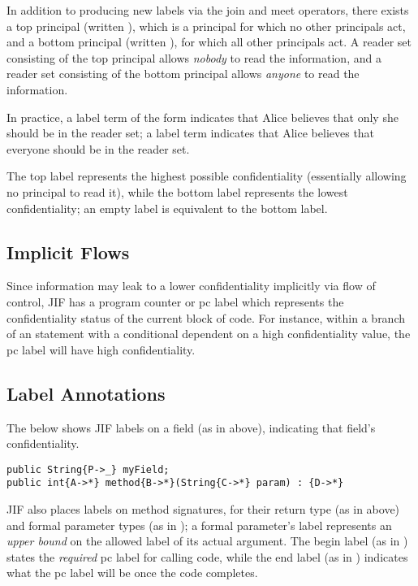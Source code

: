 In addition to producing new labels via the join and meet operators, there exists a top principal (written \code{*}), which is a principal for which no other principals act, and a bottom principal (written \code{_}), for which all other principals act. A reader set consisting of the top principal allows \textit{nobody} to read the information, and a reader set consisting of the bottom principal allows \textit{anyone} to read the information.

In practice, a label term of the form  indicates that Alice believes that only she should be in the reader set; a label term  indicates that Alice believes that everyone should be in the reader set.

The top label \jiflabel{*->*} represents the highest possible confidentiality (essentially allowing no principal to read it), while the bottom label \jiflabel{_->_} represents the lowest confidentiality; an empty label \jiflabel{} is equivalent to the bottom label.

\subsection{Implicit Flows}

Since information may leak to a lower confidentiality implicitly via flow of control, JIF has a program counter or pc label which represents the confidentiality status of the current block of code. For instance, within a branch of an  statement with a conditional dependent on a high confidentiality value, the pc label will have high confidentiality.

\subsection{Label Annotations}

The below shows JIF labels on a field (as in  above), indicating that field's confidentiality.

\begin{verbatim}
public String{P->_} myField;
public int{A->*} method{B->*}(String{C->*} param) : {D->*}
\end{verbatim}

JIF also places labels on method signatures, for their return type (as in  above) and formal parameter types (as in ); a formal parameter's label represents an \textit{upper bound} on the allowed label of its actual argument. The begin label (as in ) states the \textit{required} pc label for calling code, while the end label (as in ) indicates what the pc label will be once the code completes.

